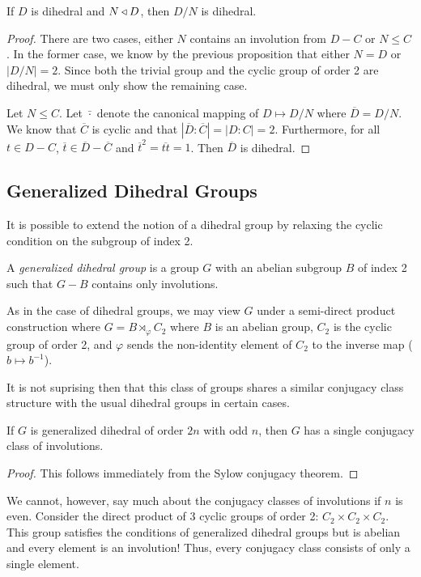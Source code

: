 \documentclass[main.tex]{subfiles}
\begin{document}
\begin{proposition}
If $D$ is dihedral and $N \triangleleft D$, then $D/N$ is dihedral.
\end{proposition}

\begin{proof}
There are two cases, either $N$ contains an involution from $D - C$  or $N \le C$. In the former case, we know by the previous proposition that either $N = D$ or $|D/N| = 2$. Since both the trivial group and the cyclic group of order 2 are dihedral, we must only show the remaining case.

Let $N \le C$. Let $\bar{ \cdot }$ denote the canonical mapping of $D \mapsto D/N$ where $\overline{D} = D/N$. We know that $\overline{C}$ is cyclic and that $|\overline{D} : \overline{C}| = |D : C| = 2$. Furthermore, for all $t \in D - C$, $\overline{t} \in \overline{D} - \overline{C}$ and $\overline{t}^2 = \overline{tt} = 1$. Then $\overline{D}$ is dihedral.

\end{proof}

\subsection{Generalized Dihedral Groups}

It is possible to extend the notion of a dihedral group by relaxing the cyclic condition on the subgroup of index 2.

\begin{definition}
A \emph{generalized dihedral group} is a group $G$ with an abelian subgroup $B$ of index 2 such that $G - B$ contains only involutions.
\end{definition}

As in the case of dihedral groups, we may view $G$ under a semi-direct product construction where $G = B \rtimes_\varphi C_2$ where $B$ is an abelian group, $C_2$ is the cyclic group of order 2, and $\varphi$ sends the non-identity element of $C_2$ to the inverse map ($b \mapsto b^{-1}$). 

It is not suprising then that this class of groups shares a similar conjugacy class structure with the usual dihedral groups in certain cases.

\begin{proposition}
If $G$ is generalized dihedral of order $2n$ with odd $n$, then $G$ has a single conjugacy class of involutions.
\end{proposition}

\begin{proof}
This follows immediately from the Sylow conjugacy theorem.
\end{proof}

We cannot, however, say much about the conjugacy classes of involutions if $n$ is even. Consider the direct product of 3 cyclic groups of order 2: $C_2 \times C_2 \times C_2$. This group satisfies the conditions of generalized dihedral groups but is abelian and every element is an involution! Thus, every conjugacy class consists of only a single element. 
\end{document}
